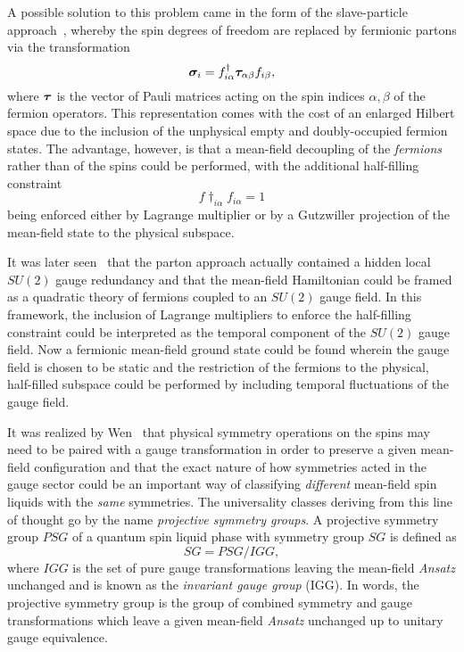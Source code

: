 A possible solution to this problem came in the form of the slave-particle approach~\cite{BaskaranSSC1987}, whereby the spin degrees of freedom are replaced by fermionic partons via the transformation
%
\begin{equation}
	\bm{\sigma}_i = f^{\dagger}_{i\alpha} \bm{\tau}_{\alpha\beta} f_{i\beta},
\end{equation}
%
where $\bm{\tau}$ is the vector of Pauli matrices acting on the spin indices $\alpha,\beta$ of the fermion operators.
This representation comes with the cost of an enlarged Hilbert space due to the inclusion of the unphysical empty and doubly-occupied fermion states.
The advantage, however, is that a mean-field decoupling of the \textit{fermions} rather than of the spins could be performed, with the additional half-filling constraint
%
\begin{equation}
	f\dag_{i\alpha} f_{i\alpha} = 1
\end{equation}
%
being enforced either by Lagrange multiplier or by a Gutzwiller projection of the mean-field state to the physical subspace.

It was later seen~\cite{AffleckPRB1988,DagottoPRB1988} that the parton approach actually contained a hidden local $SU(2)$ gauge redundancy and that the mean-field Hamiltonian could be framed as a quadratic theory of fermions coupled to an $SU(2)$ gauge field.
In this framework, the inclusion of Lagrange multipliers to enforce the half-filling constraint could be interpreted as the temporal component of the $SU(2)$ gauge field.
Now a fermionic mean-field ground state could be found wherein the gauge field is chosen to be static and the restriction of the fermions to the physical, half-filled subspace could be performed by including temporal fluctuations of the gauge field.

It was realized by Wen~\cite{WenPRB2002} that physical symmetry operations on the spins may need to be paired with a gauge transformation in order to preserve a given mean-field configuration and that the exact nature of how symmetries acted in the gauge sector could be an important way of classifying \textit{different} mean-field spin liquids with the \textit{same} symmetries.
The universality classes deriving from this line of thought go by the name \textit{projective symmetry groups}.
A projective symmetry group $PSG$ of a quantum spin liquid phase with symmetry group $SG$ is defined as
%
\begin{equation}
	SG = PSG/IGG,
\end{equation}
%
where $IGG$ is the set of pure gauge transformations leaving the mean-field \textit{Ansatz} unchanged and is known as the \textit{invariant gauge group} (IGG).
In words, the projective symmetry group is the group of combined symmetry and gauge transformations which leave a given mean-field \textit{Ansatz} unchanged up to unitary gauge equivalence.

